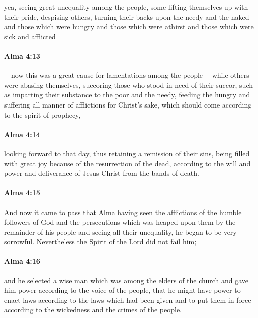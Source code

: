 			yea, seeing great unequality among the people,
			some lifting themselves up with their pride, despising others,
			turning their backs upon the needy and the naked
			and those which were hungry and those which were athirst
			and those which were sick and afflicted

		\paragraph{Alma 4:13} %
			\label{ALMA-4-13}

			---now this was a great cause for lamentations among the people---
			while others were abasing themselves,
			succoring those who stood in need of their succor,
			such as imparting their substance to the poor and the needy,
			feeding the hungry and suffering all manner of afflictions for Christ's sake,
			which should come according to the spirit of prophecy,

		\paragraph{Alma 4:14} %
			\label{ALMA-4-14}

			looking forward to that day,
			thus retaining a remission of their sins,
			being filled with great joy
			because of the resurrection of the dead,
			according to the will and power and deliverance of Jesus Christ
			from the bands of death.

		\paragraph{Alma 4:15} %
			\label{ALMA-4-15}

			And now it came to pass that
			Alma having seen the afflictions of the humble followers of God
			and the persecutions which was heaped upon them by the remainder of his people
			and seeing all their unequality,
			he began to be very sorrowful.
			Nevertheless the Spirit of the Lord did not fail him;

		\paragraph{Alma 4:16} %
			\label{ALMA-4-16}

			and he selected a wise man which was among the elders of the church
			and gave him power according to the voice of the people,
			that he might have power to enact laws
			according to the laws which had been given
			and to put them in force according to the wickedness and the crimes of the people.

